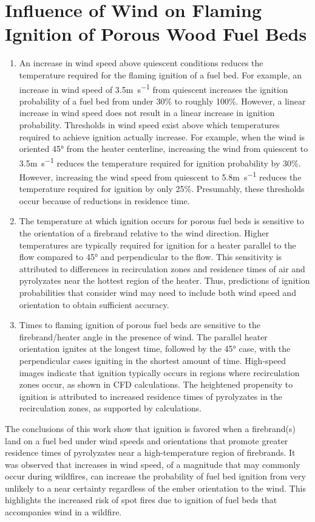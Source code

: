 \section{Influence of Wind on Flaming Ignition of Porous Wood Fuel Beds}
        \begin{enumerate}
            \item
            An increase in wind speed above quiescent conditions reduces the temperature required for the flaming ignition of a fuel bed. For example, an increase in wind speed of 3.5\si{\meter\per\second} from quiescent increases the ignition probability of a fuel bed from under 30\% to roughly 100\%. However, a linear increase in wind speed does not result in a linear increase in ignition probability. Thresholds in wind speed exist above which temperatures required to achieve ignition actually increase. For example, when the wind is oriented 45\si{\degree} from the heater centerline, increasing the wind from quiescent to 3.5\si{\meter\per\second} reduces the temperature required for ignition probability by 30\%. However, increasing the wind speed from quiescent to 5.8\si{\meter\per\second} reduces the temperature required for ignition by only 25\%. Presumably, these thresholds occur because of reductions in residence time. 
            
            \item The temperature at which ignition occurs for porous fuel beds is sensitive to the orientation of a firebrand relative to the wind direction. Higher temperatures are typically required for ignition for a heater parallel to the flow compared to 45\si{\degree} and perpendicular to the flow. This sensitivity is attributed to differences in recirculation zones and residence times of air and pyrolyzates near the hottest region of the heater. Thus, predictions of ignition probabilities that consider wind may need to include both wind speed and orientation to obtain sufficient accuracy.
            
            \item Times to flaming ignition of porous fuel beds are sensitive to the firebrand/heater angle in the presence of wind.
            The parallel heater orientation ignites at the longest time, followed by the 45\si{\degree} case, with the perpendicular cases igniting in the shortest amount of time. High-speed images indicate that ignition typically occurs in regions where recirculation zones occur, as shown in CFD calculations. The heightened propensity to ignition is attributed to increased residence times of pyrolyzates in the recirculation zones, as supported by calculations.
        \end{enumerate}
    The conclusions of this work show that ignition is favored when a firebrand(s) land on a fuel bed under wind speeds and orientations that promote greater residence times of pyrolyzates near a high-temperature region of firebrands. It was observed that increases in wind speed, of a magnitude that may commonly occur during wildfires, can increase the probability of fuel bed ignition from very unlikely to a near certainty regardless of the ember orientation to the wind. This highlights the increased risk of spot fires due to ignition of fuel beds that accompanies wind in a wildfire. 


